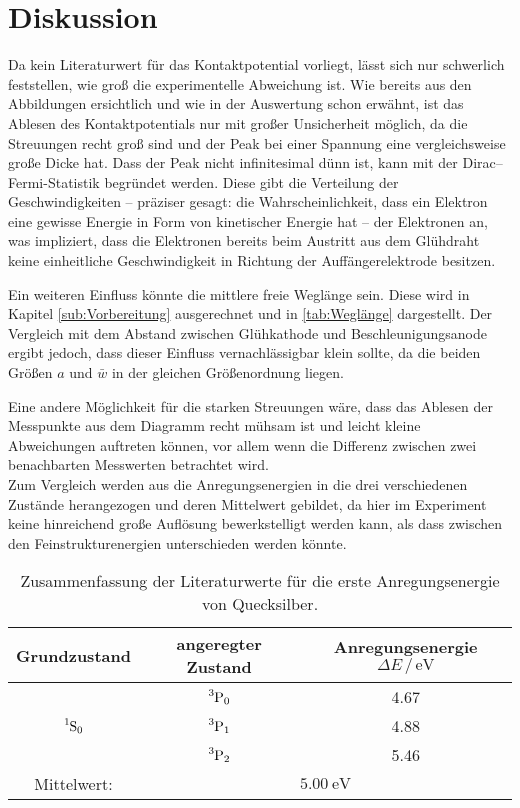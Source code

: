 \section{Diskussion}
\label{sec:Diskussion}

Da kein Literaturwert für das Kontaktpotential vorliegt, lässt sich nur schwerlich feststellen, wie groß die 
experimentelle Abweichung ist. 
Wie bereits aus den Abbildungen ersichtlich und wie in der Auswertung schon erwähnt, ist das Ablesen des Kontaktpotentials 
nur mit großer Unsicherheit möglich, da die Streuungen recht groß sind und der Peak bei einer Spannung eine vergleichsweise 
große Dicke hat. 
Dass der Peak nicht infinitesimal dünn ist, kann mit der Dirac--Fermi-Statistik begründet werden. 
Diese gibt die Verteilung der Geschwindigkeiten -- präziser gesagt: die Wahrscheinlichkeit, dass ein Elektron eine gewisse 
Energie in Form von kinetischer Energie hat -- der Elektronen an, was impliziert, dass die Elektronen bereits 
beim Austritt aus dem Glühdraht keine einheitliche Geschwindigkeit in Richtung der Auffängerelektrode besitzen. 

Ein weiteren Einfluss könnte die mittlere freie Weglänge sein. 
Diese wird in Kapitel \ref{sub:Vorbereitung} ausgerechnet und in \ref{tab:Weglänge} dargestellt. 
Der Vergleich mit dem Abstand zwischen Glühkathode und Beschleunigungsanode ergibt jedoch, dass dieser Einfluss vernachlässigbar klein sollte, 
da die beiden Größen $a$ und $\bar{w}$ in der gleichen Größenordnung liegen. 

Eine andere Möglichkeit für die starken Streuungen wäre, dass das Ablesen der Messpunkte aus dem Diagramm recht mühsam ist 
und leicht kleine Abweichungen auftreten können, vor allem wenn die Differenz zwischen zwei benachbarten Messwerten betrachtet wird. 
\\

Zum Vergleich werden aus \cite{kohlrausch} die Anregungsenergien in die drei verschiedenen Zustände herangezogen 
und deren Mittelwert gebildet, da hier im Experiment keine hinreichend große Auflösung bewerkstelligt werden kann, 
als dass zwischen den Feinstrukturenergien unterschieden werden könnte. 
\begin{table}
    \centering
    \caption{Zusammenfassung der Literaturwerte für die erste Anregungsenergie von Quecksilber\cite[460]{kohlrausch}.}
    \label{tab:Lit}
    \begin{tabular}{c c c}
        \toprule
        Grundzustand & angeregter Zustand & Anregungsenergie $\Delta E\,/\,\si{\electronvolt}$ \\
        \midrule
                    & $\ce{^3P0}$ & 4.67 \\
        $\ce{^1S0}$ & $\ce{^3P1}$ & 4.88 \\
                    & $\ce{^3P2}$ & 5.46 \\
        \midrule
        Mittelwert: & \multicolumn{2}{c}{$\SI{5.00}{\electronvolt}$} \\
        \bottomrule
    \end{tabular}
\end{table}

